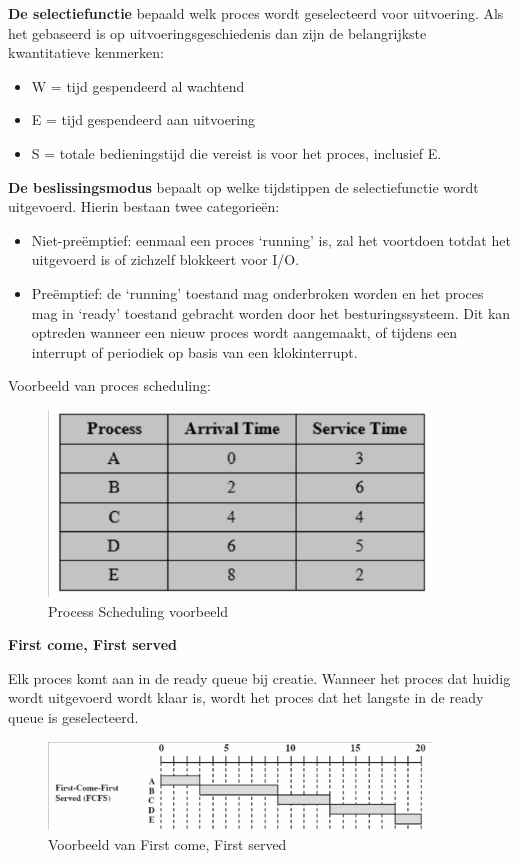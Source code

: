 \textbf{De selectiefunctie} bepaald welk proces wordt geselecteerd voor uitvoering. Als het gebaseerd is op uitvoeringsgeschiedenis dan zijn de belangrijkste kwantitatieve kenmerken:
\begin{itemize}
\item W = tijd gespendeerd al wachtend
\item E = tijd gespendeerd aan uitvoering
\item S = totale bedieningstijd die vereist is voor het proces, inclusief E.
\end{itemize}

\textbf{De beslissingsmodus} bepaalt op welke tijdstippen de selectiefunctie wordt uitgevoerd. Hierin bestaan twee categorieën:
\begin{itemize}
\item Niet-preëmptief: eenmaal een proces ‘running’ is, zal het voortdoen totdat het uitgevoerd is of zichzelf blokkeert voor I/O.
\item Preëmptief: de ‘running’ toestand mag onderbroken worden en het proces mag in ‘ready’ toestand gebracht worden door het besturingssysteem. Dit kan optreden wanneer een nieuw proces wordt aangemaakt, of tijdens een interrupt of periodiek op basis van een klokinterrupt.
\end{itemize}

Voorbeeld van proces scheduling:

\begin{figure}[htp]
    \centering
            \includegraphics[width=4in]{img/processcheduling.png}
        \caption{Process Scheduling voorbeeld}
    \label{fig:Process Scheduling voorbeeld}
\end{figure}

\textbf{First come, First served}

Elk proces komt aan in de ready queue bij creatie. Wanneer het proces dat huidig wordt uitgevoerd wordt klaar is, wordt het proces dat het langste in de ready queue is geselecteerd.


\begin{figure}[htp]
    \centering
            \includegraphics[width=4in]{img/firstcomefirstserved.png}
        \caption{Voorbeeld van First come, First served}
    \label{fig:First come, First served voorbeeld}
\end{figure}

